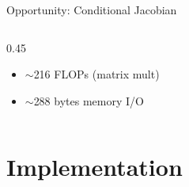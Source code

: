\documentclass[aspectratio=169, table]{beamer}
\begin{document}
\begin{frame}{Opportunity: Conditional Jacobian}
\begin{columns}[T]
\begin{column}{0.45\textwidth}
        \vspace{1em}
        \begin{tcolorbox}[colback=acadgreen!10, colframe=acadgreen, title=Savings (per surface), fonttitle=\bfseries\small]
            \begin{itemize}
                \item $\sim$216 FLOPs (matrix mult)
                \item $\sim$288 bytes memory I/O
            \end{itemize}
        \end{tcolorbox}
    \end{column}
\end{columns}
\end{frame}

\section{Implementation}
\end{document}

